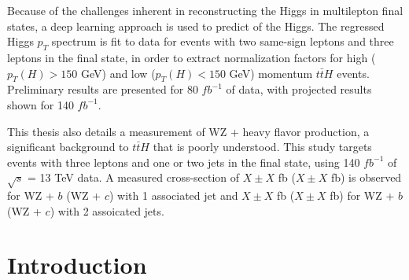 \documentclass[12pt]{report}	%
\theoremstyle{definition}
\theoremstyle{remark}
\begin{document}
\par Because of the challenges inherent in reconstructing the Higgs in multilepton final states, a deep learning approach is used to predict of the Higgs. The regressed Higgs $p_T$ spectrum is fit to data for events with two same-sign leptons and three leptons in the final state, in order to extract normalization factors for high ($p_{T}(H) > 150$ GeV) and low ($p_{T}(H) < 150$ GeV) momentum $t\bar{t}H$ events. Preliminary results are presented for 80 $fb^{-1}$ of data, with projected results shown for 140 $fb^{-1}$.

\par This thesis also details a measurement of WZ + heavy flavor production, a significant background to $t\bar{t}H$ that is poorly understood. This study targets events with three leptons and one or two jets in the final state, using 140 $fb^{-1}$ of  $\sqrt{s}$ = 13 TeV data. A measured cross-section of $X\pm X$ fb ($X\pm X$ fb) is observed for WZ + $b$ (WZ + $c$) with 1 associated jet and $X\pm X$ fb ($X\pm X$ fb) for WZ + $b$ (WZ + $c$) with 2 assoicated jets.



\tableofcontents   %

\listoftables      %
\listoffigures     %


%
%
\chapter{Introduction}
\label{part:intro}
% 
\end{document}
